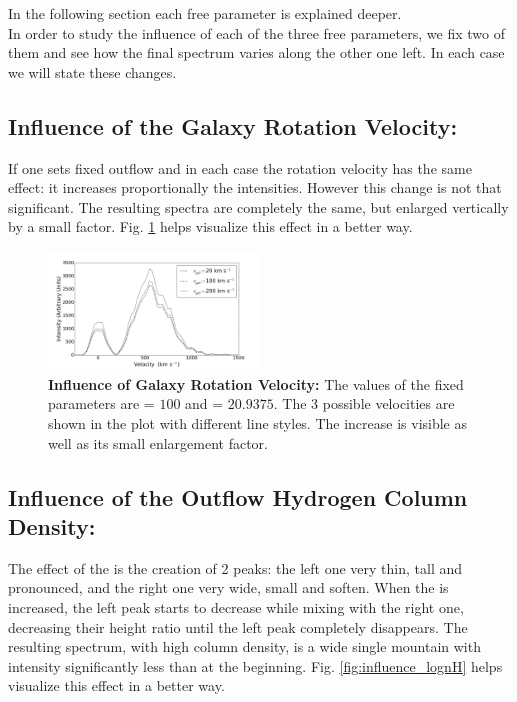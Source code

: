 In the following section each free parameter is explained deeper. \\

In order to study the influence of each of the three free parameters, we fix two of them and see how the final spectrum varies along the other one left. In each case we will state these changes.\\

\subsection{Influence of the Galaxy Rotation Velocity: \vrot}

If one sets fixed outflow \vout and \lognh in each case the rotation velocity has the same effect: it increases proportionally the intensities. However this change is not that significant. The resulting spectra are completely the same, but enlarged vertically by a small factor. Fig. \ref{fig:influence_vrot} helps visualize this effect in a better way.\\

\begin{figure}[h!]
	\begin{center}
		\includegraphics[width=0.5\textwidth]{./figures/inf_vgal_soft.png}
	\end{center}
	\caption{\textbf{Influence of Galaxy Rotation Velocity:} The values of the fixed parameters are \vout = $100$ \kms and \lognh = $20.9375$. The 3 possible velocities are shown in the plot with different line styles. The increase is visible as well as its small enlargement factor.}
	\label{fig:influence_vrot}
\end{figure}

\subsection{Influence of the Outflow Hydrogen Column Density: \lognh }

The effect of the \lognh is the creation of 2 peaks: the left one very thin, tall and pronounced, and the right one very wide, small and soften. When the \lognh is increased, the left peak starts to decrease while mixing with the right one, decreasing their height ratio until the left peak completely disappears. The resulting spectrum, with high column density, is a wide single mountain with intensity significantly less than at the beginning. Fig. \ref{fig:influence_lognH} helps visualize this effect in a better way.\\


